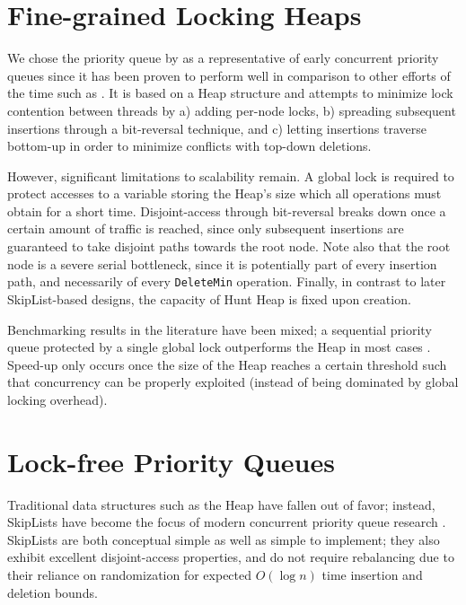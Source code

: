 \documentclass[a4paper,10pt]{article}
\begin{document}
\section{Fine-grained Locking Heaps} \label{sec:hunt}

We chose the priority queue by \citeauthor{hunt1996efficient} \cite{hunt1996efficient}
as a representative of early concurrent priority queues since it has been proven to
perform well \cite{shavit2000skiplist} in comparison to other efforts of the time such as \cite{nageshwara1988concurrent,ayani1990lr,yan1998lock}. %
It is based on a Heap
structure and attempts to minimize lock contention between threads by a) adding per-node
locks, b) spreading subsequent insertions through a bit-reversal technique, %
and c) letting insertions traverse bottom-up in order to minimize conflicts with
top-down deletions.

However, significant limitations to scalability remain. A global lock is required
to protect accesses to a variable storing the Heap's size which all operations
must obtain for a short time. Disjoint-access through bit-reversal breaks down
once a certain amount of traffic is reached, since only subsequent insertions
are guaranteed to take disjoint paths towards the root node. Note also that
the root node is a severe serial bottleneck, since it is potentially part of
every insertion path, and necessarily of every \lstinline|DeleteMin| operation.
Finally, in contrast to later SkipList-based designs, the capacity of Hunt Heap
is fixed upon creation.

Benchmarking results in the literature have been mixed; a sequential priority
queue protected by a single global lock outperforms the \citeauthor{hunt1996efficient}
Heap in most cases \cite{hunt1996efficient,sundell2003fast}. Speed-up only occurs once
the size of the Heap reaches a certain threshold such that concurrency
can be properly exploited (instead of being dominated by global locking overhead).

\section{Lock-free Priority Queues} \label{sec:lockfree}

Traditional data structures such as the Heap have fallen out of favor;
instead, SkipLists \cite{pugh1990skip,pugh1998concurrent} have become the focus
of modern concurrent priority queue research
\cite{shavit2000skiplist,sundell2003fast,herlihy2012art,linden2013skiplist,alistarhspraylist}.
SkipLists are both conceptual simple as well as simple to implement; they also exhibit
excellent disjoint-access properties, and do not require rebalancing due to their
reliance on randomization for expected $O(\log n)$ time insertion and deletion bounds.
\end{document}
